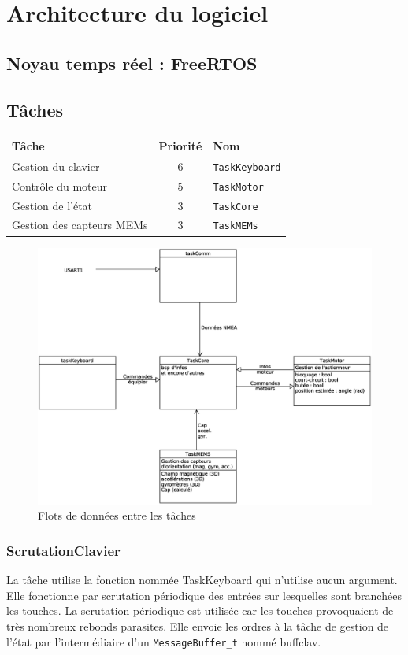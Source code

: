 \documentclass[a4paper,11pt]{report}
\begin{document}
\chapter{Architecture du logiciel}
\section{Noyau temps réel : FreeRTOS}
\section{Tâches}
\begin{tabular}{|l|c|l|}
\hline 
Tâche & Priorité & Nom \\
\hline 
Gestion du clavier & 6 & \texttt{TaskKeyboard}\\
Contrôle du moteur & 5 & \texttt{TaskMotor}\\
Gestion de l'état & 3 & \texttt{TaskCore}\\
Gestion des capteurs MEMs & 3 & \texttt{TaskMEMs}\\
\hline
\end{tabular} 

\begin{figure}[!h]
    \includegraphics[scale=0.3]{diagram-Taches}
	\caption{Flots de données entre les tâches}
\end{figure}

\subsection{ScrutationClavier}
La tâche utilise la fonction nommée TaskKeyboard qui n'utilise aucun argument.
Elle fonctionne par scrutation périodique des entrées sur lesquelles sont branchées les touches.
La scrutation périodique est utilisée car les touches provoquaient de très nombreux
rebonds parasites. 
Elle envoie les ordres à la tâche de gestion de l'état
par l'intermédiaire d'un \texttt{MessageBuffer\_t} nommé buffclav.
\end{document}
